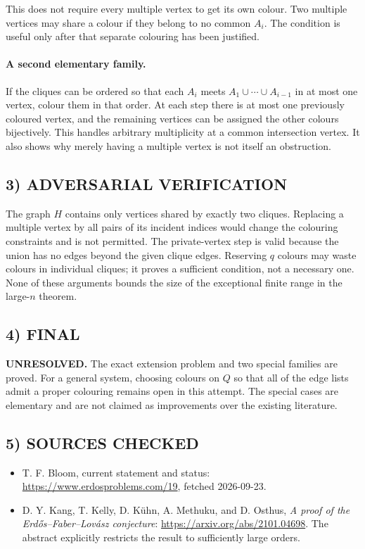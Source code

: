 This does not require every multiple vertex to get its own colour. Two multiple vertices may share a colour if they belong to no common $A_i$. The condition is useful only after that separate colouring has been justified.

\paragraph{A second elementary family.}
If the cliques can be ordered so that each $A_i$ meets $A_1\cup\cdots\cup A_{i-1}$ in at most one vertex, colour them in that order. At each step there is at most one previously coloured vertex, and the remaining vertices can be assigned the other colours bijectively. This handles arbitrary multiplicity at a common intersection vertex. It also shows why merely having a multiple vertex is not itself an obstruction.

\subsection{3) ADVERSARIAL VERIFICATION}
The graph $H$ contains only vertices shared by exactly two cliques. Replacing a multiple vertex by all pairs of its incident indices would change the colouring constraints and is not permitted. The private-vertex step is valid because the union has no edges beyond the given clique edges. Reserving $q$ colours may waste colours in individual cliques; it proves a sufficient condition, not a necessary one. None of these arguments bounds the size of the exceptional finite range in the large-$n$ theorem.

\subsection{4) FINAL}
\textbf{UNRESOLVED.} The exact extension problem and two special families are proved. For a general system, choosing colours on $Q$ so that all of the edge lists admit a proper colouring remains open in this attempt. The special cases are elementary and are not claimed as improvements over the existing literature.

\subsection{5) SOURCES CHECKED}
\begin{itemize}
\item T. F. Bloom, current statement and status: \url{https://www.erdosproblems.com/19}, fetched 2026-09-23.
\item D. Y. Kang, T. Kelly, D. K\"uhn, A. Methuku, and D. Osthus, \emph{A proof of the Erd\H{o}s--Faber--Lov\'asz conjecture}: \url{https://arxiv.org/abs/2101.04698}. The abstract explicitly restricts the result to sufficiently large orders.
\end{itemize}

